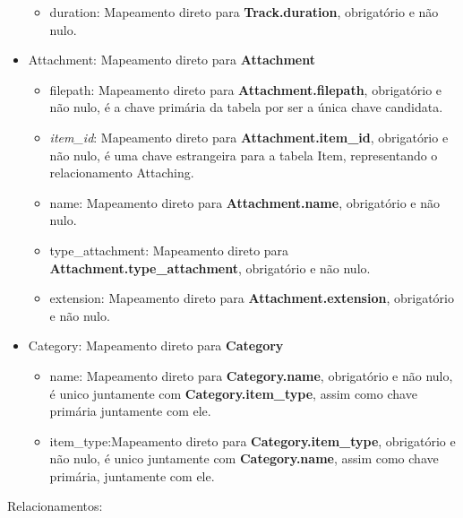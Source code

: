 \documentclass[a4paper, 11pt]{article}
\begin{document}
\begin{itemize}
\begin{itemize}
        \item duration: Mapeamento direto para {\textbf{Track.duration}}, obrigatório e não nulo.
    \end{itemize}
    \item Attachment: Mapeamento direto para {\textbf{Attachment}}
    \begin{itemize}
        \item filepath: Mapeamento direto para \textbf{Attachment.filepath}, obrigatório e não nulo, é a chave primária da tabela por ser a única chave candidata.
        \item \textit{item\_id}: Mapeamento direto para \textbf{Attachment.item\_id}, obrigatório e não nulo, é uma chave estrangeira para a tabela Item, representando o relacionamento Attaching.
        \item name: Mapeamento direto para \textbf{Attachment.name}, obrigatório e não nulo.
        \item type\_attachment: Mapeamento direto para \textbf{Attachment.type\_attachment}, obrigatório e não nulo.
        \item extension: Mapeamento direto para \textbf{Attachment.extension}, obrigatório e não nulo.
    \end{itemize}
    \item Category: Mapeamento direto para {\textbf{Category}}
    \begin{itemize}
        \item name: Mapeamento direto para \textbf{Category.name}, obrigatório e não nulo, é unico juntamente com \textbf{Category.item\_type}, assim como chave primária juntamente com ele. 
        \item item\_type:Mapeamento direto para \textbf{Category.item\_type}, obrigatório e não nulo, é unico juntamente com \textbf{Category.name}, assim como chave primária, juntamente com ele.
    \end{itemize}
\end{itemize}
\break
Relacionamentos:
\end{document}
